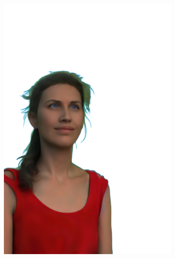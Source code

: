 \begin{figure}[ht]
\begin{subfigure}{0.08\linewidth}
        \includegraphics[width=\textwidth]{Figures/results/low/dora_3d/11_render.png}

\end{subfigure}
\end{figure}
